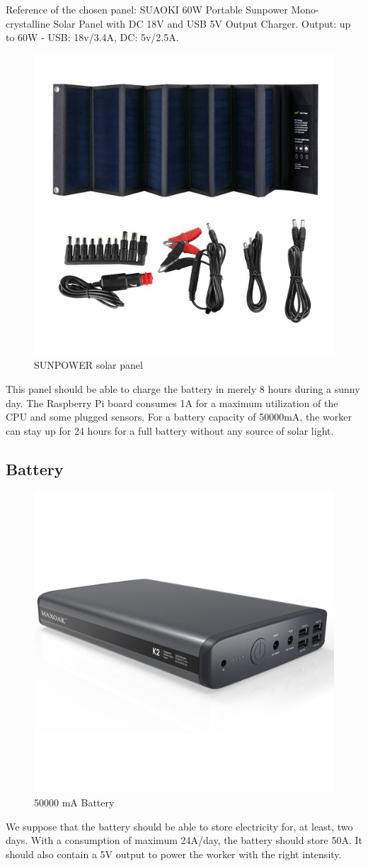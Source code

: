         Reference of the chosen panel: SUAOKI 60W Portable Sunpower Mono-crystalline Solar Panel with DC 18V and USB
        5V Output Charger.\newline
        Output: up to 60W - USB: 18v/3.4A, DC: 5v/2.5A.

        \begin{figure}[!h]\centering
            \includegraphics[width=.4\columnwidth]{5-Design/figs/panel.jpg}
            \caption{SUNPOWER solar panel}
        \end{figure}

        This panel should be able to charge the battery in merely 8 hours during a sunny day. The Raspberry
        Pi board consumes 1A for a maximum utilization of the CPU and some plugged sensors. For a battery
        capacity of 50000mA, the worker can stay up for 24 hours for a full battery without any source of
        solar light.

    \subsection{Battery}

        \begin{figure}[!h]\centering
            \includegraphics[width=.3\columnwidth]{5-Design/figs/battery.jpg}
            \caption{50000 mA Battery}
        \end{figure}

        We suppose that the battery should be able to store electricity for, at least, two days. With a
        consumption of maximum 24A/day, the battery should store 50A. It should also contain a 5V output
        to power the worker with the right intensity.

